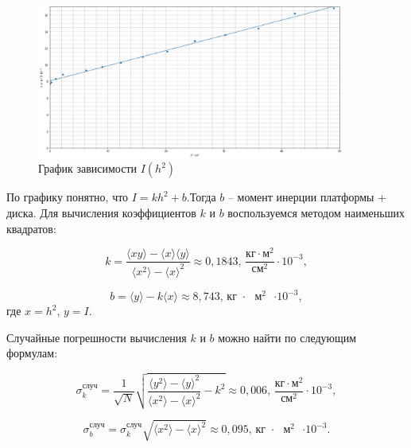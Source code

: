 \documentclass[a4paper,12pt]{article}
\begin{document}
	\begin{figure}[!h]
		\begin{center}
			\includegraphics[width=0.9\textwidth]{1.2.3 graph}
			\caption{График зависимости $ I(h^2) $}
			\label{ris:grafik}
		\end{center}
	\end{figure}
	
	По графику понятно, что $I = kh^2 + b$.Тогда $b$ -- момент инерции платформы + диска. Для вычисления коэффициентов $ k $ и $ b $ воспользуемся методом наименьших квадратов:
	
	\begin{equation}
		k=\frac{\langle xy\rangle-\langle x\rangle \langle y\rangle}{\langle x^2\rangle - \langle x\rangle^2}\approx 0,1843\text{, } \frac{\text{кг}\cdot\text{м}^2}{\text{см}^2}\cdot 10^{-3},
	\end{equation}
	
	\begin{equation}
		b=\langle y \rangle -k\langle x \rangle\approx 8,743\text{,  кг $\cdot$ $\text{м}^2$ $\cdot 10^{-3}$},
	\end{equation}
	где $ x=h^2 $, $ y=I $.
	
	Случайные погрешности вычисления $ k $ и $ b $ можно найти по следующим формулам:
	
	\begin{equation}
		\sigma_k^\text{случ}=\frac{1}{\sqrt{N}}\sqrt{\frac{\langle y^2 \rangle - \langle y \rangle^2}{\langle x^2 \rangle - \langle x \rangle^2} - k^2  } \approx 0,006 \text{, } \frac{\text{кг}\cdot\text{м}^2}{\text{см}^2}\cdot 10^{-3},
	\end{equation}
	
	\begin{equation}
		\sigma_b^\text{случ}= \sigma_k^\text{случ} \sqrt{\langle x^2 \rangle - \langle x \rangle^2} \approx 0,095 \text{,  кг $\cdot$ $\text{м}^2$ $\cdot 10^{-3}$}.
	\end{equation}
	
\end{document}
